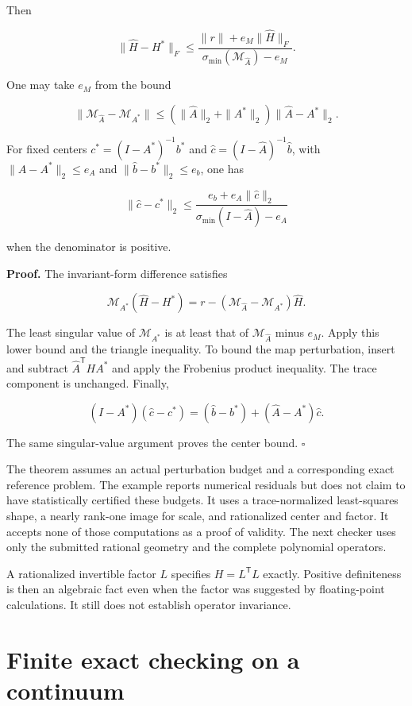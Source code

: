 Then

\[
\boxed{
\|\widehat H-H^*\|_F
\leq
\frac{\|r\|+e_M\|\widehat H\|_F}
{\sigma_{\min}(\mathcal M_{\widehat A})-e_M}.
}
\]

One may take \(e_M\) from the bound

\[
\|\mathcal M_{\widehat A}-\mathcal M_{A^*}\|\leq(\|\widehat A\|_2+\|A^*\|_2)\|\widehat A-A^*\|_2.
\]

For fixed centers \(c^*=(I-A^*)^{-1}b^*\) and
\(\widehat c=(I-\widehat A)^{-1}\widehat b\), with
\(\|\widehat A-A^*\|_2\leq e_A\) and \(\|\widehat b-b^*\|_2\leq e_b\),
one has

\[
\|\widehat c-c^*\|_2
\leq\frac{e_b+e_A\|\widehat c\|_2}
{\sigma_{\min}(I-\widehat A)-e_A}
\]

when the denominator is positive.

\textbf{Proof.} The invariant-form difference satisfies

\[
\mathcal M_{A^*}(\widehat H-H^*)
=r-(\mathcal M_{\widehat A}-\mathcal M_{A^*})\widehat H.
\]

The least singular value of \(\mathcal M_{A^*}\) is at least that of
\(\mathcal M_{\widehat A}\) minus \(e_M\). Apply this lower bound and
the triangle inequality. To bound the map perturbation, insert and
subtract \(\widehat A^{\mathsf T}HA^*\) and apply the Frobenius product
inequality. The trace component is unchanged. Finally,

\[
(I-A^*)(\widehat c-c^*)=(\widehat b-b^*)+(\widehat A-A^*)\widehat c.
\]

The same singular-value argument proves the center bound. \(\square\)

The theorem assumes an actual perturbation budget and a corresponding
exact reference problem. The example reports numerical residuals but
does not claim to have statistically certified these budgets. It uses a
trace-normalized least-squares shape, a nearly rank-one image for scale,
and rationalized center and factor. It accepts none of those
computations as a proof of validity. The next checker uses only the
submitted rational geometry and the complete polynomial operators.

A rationalized invertible factor \(L\) specifies \(H=L^{\mathsf T}L\)
exactly. Positive definiteness is then an algebraic fact even when the
factor was suggested by floating-point calculations. It still does not
establish operator invariance.

\section{Finite exact checking on a continuum}\label{LSM:finite-exact-checking-on-a-continuum}

